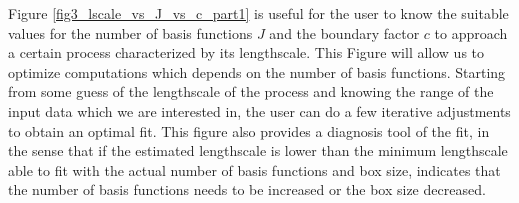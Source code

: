 \documentclass[]{interact}
\theoremstyle{plain}%
\theoremstyle{definition}
\theoremstyle{remark}
\begin{document}
Figure \ref{fig3_lscale_vs_J_vs_c_part1} is useful for the user to know the suitable values for the number of basis functions $J$ and the boundary factor $c$ to approach a certain process characterized by its lengthscale. This Figure will allow us to optimize computations which depends on the number of basis functions. Starting from some guess of the lengthscale of the process and knowing the range of the input data which we are interested in, the user can do a few iterative adjustments to obtain an optimal fit. This figure also provides a diagnosis tool of the fit, in the sense that if the estimated lengthscale is lower than the minimum lengthscale able to fit with the actual number of basis functions and box size, indicates that the number of basis functions needs to be increased or the box size decreased. 

\begin{figure}[H]
\centering
{}

\end{figure}
\end{document}
